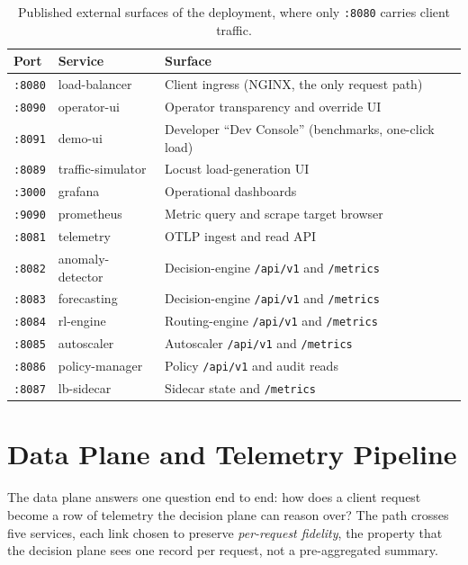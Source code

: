 \begin{table}[H]
\centering
\caption[Published external surfaces of the deployment]{Published external surfaces of the deployment, where only \texttt{:8080} carries client traffic.}
\label{tab:ima:ports}
\small
\begin{tabularx}{\linewidth}{@{}l l Y@{}}
\toprule
\textbf{Port} & \textbf{Service} & \textbf{Surface} \\
\midrule
\texttt{:8080} & load-balancer    & Client ingress (NGINX, the only request path) \\
\texttt{:8090} & operator-ui      & Operator transparency and override UI \\
\texttt{:8091} & demo-ui          & Developer ``Dev Console'' (benchmarks, one-click load) \\
\texttt{:8089} & traffic-simulator& Locust load-generation UI \\
\texttt{:3000} & grafana          & Operational dashboards \\
\texttt{:9090} & prometheus       & Metric query and scrape target browser \\
\texttt{:8081} & telemetry        & OTLP ingest and read API \\
\texttt{:8082} & anomaly-detector & Decision-engine \texttt{/api/v1} and \texttt{/metrics} \\
\texttt{:8083} & forecasting      & Decision-engine \texttt{/api/v1} and \texttt{/metrics} \\
\texttt{:8084} & rl-engine        & Routing-engine \texttt{/api/v1} and \texttt{/metrics} \\
\texttt{:8085} & autoscaler       & Autoscaler \texttt{/api/v1} and \texttt{/metrics} \\
\texttt{:8086} & policy-manager   & Policy \texttt{/api/v1} and audit reads \\
\texttt{:8087} & lb-sidecar       & Sidecar state and \texttt{/metrics} \\
\bottomrule
\end{tabularx}
\end{table}

\section{Data Plane and Telemetry Pipeline}
\label{sec:ima:dataplane}

The data plane answers one question end to end: how does a client request become a
row of telemetry the decision plane can reason over? The path crosses five
services, each link chosen to preserve \emph{per-request fidelity}, the property
that the decision plane sees one record per request, not a pre-aggregated summary.

